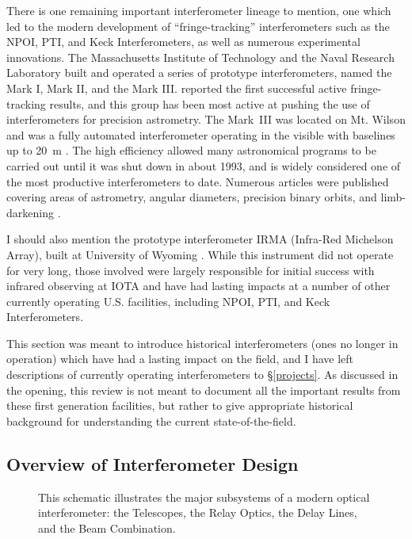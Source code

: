 \documentclass[12pt]{article}
\begin{document}
There is one remaining important interferometer lineage to mention,
one which led to the modern development of ``fringe-tracking''
interferometers such as the NPOI, PTI, and Keck Interferometers, as
well as numerous experimental innovations.  The Massachusetts
Institute of Technology and the Naval Research Laboratory built and
operated a series of prototype interferometers, named the Mark I, Mark
II, and the Mark III.  \citet{shao1980} reported the first successful
active fringe-tracking results, and this group has been most active at
pushing the use of interferometers for precision astrometry.  The
Mark~III was located on Mt. Wilson and was a fully automated
interferometer operating in the visible with baselines up to 20~m
\citep{markiii}.  The high efficiency allowed many astronomical
programs to be carried out until it was shut down in about 1993,
and is widely considered one of the most productive interferometers to date.
Numerous articles were published covering areas of astrometry, angular
diameters, precision binary orbits, and limb-darkening
\citep[e.g.,][]{mozurk1988,hutter1989,mozurk1991,armstrong1992,
hummel1995,quirrenbach1996}.

I should also mention the prototype interferometer IRMA (Infra-Red
Michelson Array), built at University of Wyoming \citep{dyck1993}.
While this instrument did not operate for very long, those involved
were largely responsible for initial success with infrared observing
at IOTA and have had lasting impacts at a number of other currently
operating U.S. facilities, including NPOI, PTI, and Keck
Interferometers.

This section was meant to introduce historical interferometers (ones
no longer in operation) which have had a lasting impact on the field,
and I have left descriptions of currently operating interferometers to
\S\ref{projects}.  As discussed in the opening, this review is not
meant to document all the important results from these first
generation facilities, but rather to give appropriate historical
background for understanding the current state-of-the-field.

\subsection{Overview of Interferometer Design}


\begin{figure}
\begin{center}
\caption{This schematic illustrates the major subsystems of a modern
optical interferometer: the Telescopes, the Relay Optics, the Delay Lines,
and the Beam Combination.
\label{fig_realinterferometer}}
\end{center}
\end{figure}
\end{document}
